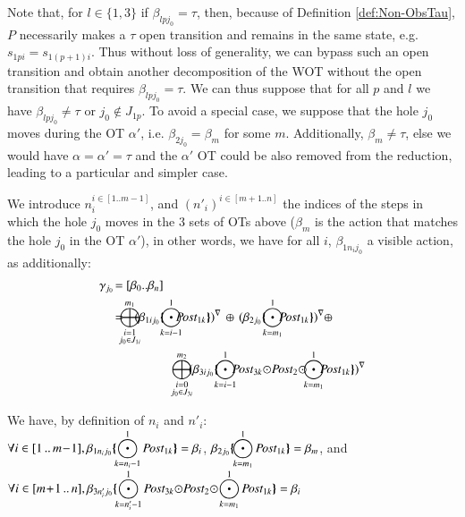 \documentclass{elsarticle}
\newcommand{\shortodot}{\!\odot\!}
\begin{document}
Note that, for $l\in\{1,3\}$ if $\beta_{l p j_0}=\tau$, then, because of Definition \ref{def:Non-ObsTau}, $P$ necessarily makes a $\tau$ open transition and remains in the same state, e.g. $s_{1pi} = s_{1(p+1)i}$. Thus without loss of generality, we can bypass such an open transition and obtain another decomposition of the WOT without the open transition that requires ${\beta_{lp{j_0}}}=\tau$. We can thus  suppose that for all $p$ and $l$ we have ${\beta_{lp{j_0}}}\neq\tau$ or $j_0\not\in J_{1 p}$. To avoid a special case, we suppose that the hole $j_0$ moves during the OT $\alpha'$, i.e. $\beta_{2 j_0}=\beta_{m}$ for some $m$. Additionally, $\beta_{m}\neq \tau$, else we would have $\alpha=\alpha'=\tau$ and the $\alpha'$ OT could be also removed from the reduction, leading to a particular and simpler case.


We introduce $n_i^{i\in[1..m-1]}$, and $(n'_i)^{i\in[m+1..n]}$ the indices of the steps in 
which the hole $j_0$ moves in the 3 sets of OTs above ($\beta_m$ is the action that matches the hole $j_0$ in the OT $\alpha'$), in other words, we have for all $i$, $\beta_{1 n_i j_0}$ a visible action, as additionally:\\
{\small
\begin{align*}
\gamma_{j_0}\!=&~[\beta_0..\beta_n]\\
 =&\!\!
{\bigoplus_{\substack{i=1\\j_0\in J_{1i}}}^{m_1}\!\!\! \vis{{\beta_{1ij_0}}\subst{\!\bigodot_{k=i-1}^{1} \!\!\!\!\Post_{1k} } }  \,\oplus\, \vis{{\beta_{2j_0}}\subst{\!\bigodot_{k=m_1}^{1}\!\!\!\Post_{1k}}}}\oplus\! \\
&\qquad\qquad
{ \!\bigoplus_{\substack{i=0\\j_0\in J_{3i}}}^{m_2}\!\! \vis{{\beta_{3ij_0}} \subst{\!\bigodot_{k=i-1}^{1}\!\!\!\Post_{3k}\shortodot\Post_2\shortodot
\!\!\bigodot_{k=m_1}^{1}\!\!\!\Post_{1k}}}}
\end{align*}}

\noindent We have, by definition of $n_i$ and $n'_i$:\\
$\displaystyle{\forall{i\in[1\,..\,m\!-\!1]}, \beta_{1 n_i j_0}\subst{\bigodot_{k=n_i-1}^{1}\Post_{1k}}=\beta_i}$, \qquad$\displaystyle{\beta_{2 j_0}\subst{\bigodot_{k=m_1}^{1} \Post_{1k} }=\beta_m}$, and \\
$\displaystyle{\forall{i\in[m\!+\!1\,..\,n]}, \beta_{3 n_i' j_0}\subst{\bigodot_{k=n_i'-1}^{1}\Post_{3k}\shortodot\Post_2\shortodot\bigodot_{k=m_1}^{1}\Post_{1k}}=\beta_i}$\\
\end{document}

